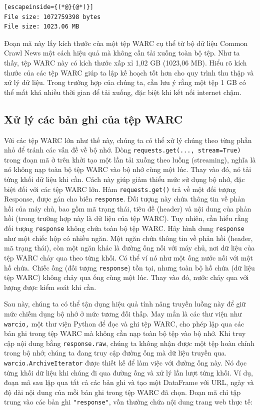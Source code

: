 \begin{lstlisting}[escapeinside={(*@}{@*)}]
File size: 1072759398 bytes
File size: 1023.06 MB
\end{lstlisting}

Đoạn mã này lấy kích thước của một tệp WARC cụ thể từ bộ dữ liệu Common Crawl News một cách hiệu quả mà không cần tải xuống toàn bộ tệp. Như ta thấy, tệp WARC này có kích thước xấp xỉ 1,02 GB (1023,06 MB). Hiểu rõ kích thước của các tệp WARC giúp ta lập kế hoạch tốt hơn cho quy trình thu thập và xử lý dữ liệu. Trong trường hợp của chúng ta, cần lưu ý rằng một tệp 1 GB có thể mất khá nhiều thời gian để tải xuống, đặc biệt khi kết nối internet chậm.

\subsection{Xử lý các bản ghi của tệp WARC}

Với các tệp WARC lớn như thế này, chúng ta có thể xử lý chúng theo từng phần nhỏ để tránh các vấn đề về bộ nhớ. Dòng \texttt{requests.get(...,\ stream=True)} trong đoạn mã ở trên khởi tạo một lần tải xuống theo luồng (streaming), nghĩa là nó không nạp toàn bộ tệp WARC vào bộ nhớ cùng một lúc. Thay vào đó, nó tải từng khối dữ liệu khi cần. Cách này giúp giảm thiểu mức sử dụng bộ nhớ, đặc biệt đối với các tệp WARC lớn. Hàm \texttt{requests.get()} trả về một đối tượng Response, được gán cho biến \texttt{response}. Đối tượng này chứa thông tin về phản hồi của máy chủ, bao gồm mã trạng thái, tiêu đề (header) và nội dung của phản hồi (trong trường hợp này là dữ liệu của tệp WARC). Tuy nhiên, cần hiểu rằng đối tượng \texttt{response} không chứa toàn bộ tệp WARC. Hãy hình dung \texttt{response} như một chiếc hộp có nhiều ngăn. Một ngăn chứa thông tin về phản hồi (header, mã trạng thái), còn một ngăn khác là đường ống nối với máy chủ, nơi dữ liệu của tệp WARC chảy qua theo từng khối. Có thể ví nó như một ống nước nối với một hồ chứa. Chiếc ống (đối tượng \texttt{response}) tồn tại, nhưng toàn bộ hồ chứa (dữ liệu tệp WARC) không chảy qua ống cùng một lúc. Thay vào đó, nước chảy qua với lượng được kiểm soát khi cần.

Sau này, chúng ta có thể tận dụng hiệu quả tính năng truyền luồng này để giữ mức chiếm dụng bộ nhớ ở mức tương đối thấp. May mắn là các thư viện như \texttt{warcio,} một thư viện Python để đọc và ghi tệp WARC, cho phép lặp qua các bản ghi trong tệp WARC mà không cần nạp toàn bộ tệp vào bộ nhớ. Khi truy cập nội dung bằng \texttt{response.raw}, chúng ta không nhận được một tệp hoàn chỉnh trong bộ nhớ; chúng ta đang truy cập đường ống mà dữ liệu truyền qua. \texttt{warcio.ArchiveIterator} được thiết kế để làm việc với đường ống này. Nó đọc từng khối dữ liệu khi chúng đi qua đường ống và xử lý lần lượt từng khối. Ví dụ, đoạn mã sau lặp qua tất cả các bản ghi và tạo một DataFrame với URL, ngày và độ dài nội dung của mỗi bản ghi trong tệp WARC đã chọn. Đoạn mã chỉ tập trung vào các bản ghi \texttt{"response"}, vốn thường chứa nội dung trang web thực tế:

